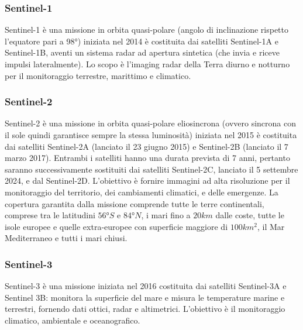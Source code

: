 \subsubsection{Sentinel-1}
Sentinel-1 è una missione in orbita quasi-polare \cite{ORBITA_POLARE} (angolo di inclinazione rispetto 
l’equatore pari a 98°) iniziata nel 2014 è costituita dai satelliti Sentinel-1A e Sentinel-1B, 
aventi un sistema radar ad apertura sintetica (che invia e riceve impulsi lateralmente). Lo 
scopo è l’imaging radar della Terra diurno e notturno per il monitoraggio terrestre, 
marittimo e climatico.


\subsubsection{Sentinel-2}

Sentinel-2 è una missione in orbita quasi-polare eliosincrona \cite{ELIO_SINCRONA} 
(ovvero sincrona con il sole 
quindi garantisce sempre la stessa luminosità) iniziata nel 2015 è costituita dai satelliti 
Sentinel-2A (lanciato il 23 giugno 2015) e Sentinel-2B (lanciato il 7 marzo 2017). 
Entrambi i satelliti hanno una durata prevista di 7 anni, pertanto saranno 
successivamente sostituiti dai satelliti Sentinel-2C, lanciato il 5 settembre 2024, e 
dal Sentinel-2D.
L’obiettivo è fornire immagini ad alta risoluzione per il 
monitoraggio del territorio, dei cambiamenti climatici, e delle emergenze. 
La copertura garantita dalla missione comprende tutte le terre continentali, comprese
tra le latitudini $56°S$ e $84°N$, i mari fino a $20 km$ dalle coste, tutte le isole europee e
quelle extra-europee con superficie maggiore di $100 km^2$, il Mar Mediterraneo e tutti
i mari chiusi. 

\subsubsection{Sentinel-3}
Sentinel-3 è una missione iniziata nel 2016 costituita dai satelliti Sentinel-3A e Sentinel
3B: monitora la superficie del mare e misura le temperature marine e terrestri, fornendo 
dati ottici, radar e altimetrici. L’obiettivo è il monitoraggio climatico, ambientale e 
oceanografico.


